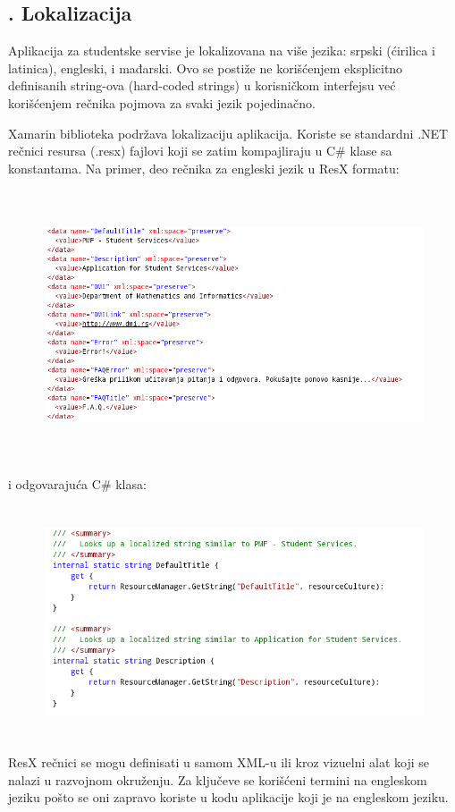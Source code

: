 \documentclass[a4paper]{article}
\begin{document}
\subsection[7.7. Lokalizacija]{. Lokalizacija}
\hypertarget{RefHeadingToc858882405265}{}Aplikacija za studentske
servise je lokalizovana na više jezika: srpski (ćirilica i latinica),
engleski, i mađarski. Ovo se postiže ne korišćenjem eksplicitno
definisanih string-ova (hard-coded strings) u korisničkom interfejsu
već korišćenjem rečnika pojmova za svaki jezik pojedinačno.

Xamarin biblioteka podržava lokalizaciju aplikacija. Koriste se
standardni .NET rečnici resursa (.resx) fajlovi koji se zatim
kompajliraju u C\# klase sa konstantama. Na primer, deo rečnika za
engleski jezik u ResX formatu:

\begin{figure}
\centering
\includegraphics[width=154.78mm,height=79.67mm]{msc-img50.png}
\end{figure}
i odgovarajuća C\# klasa:



\begin{figure}
\centering
\includegraphics[width=138.09mm,height=68.53mm]{msc-img51.png}
\end{figure}
ResX rečnici se mogu definisati u samom XML-u ili kroz vizuelni alat
koji se nalazi u razvojnom okruženju. Za ključeve se korišćeni termini
na engleskom jeziku pošto se oni zapravo koriste u kodu aplikacije koji
je na engleskom jeziku.
\end{document}
